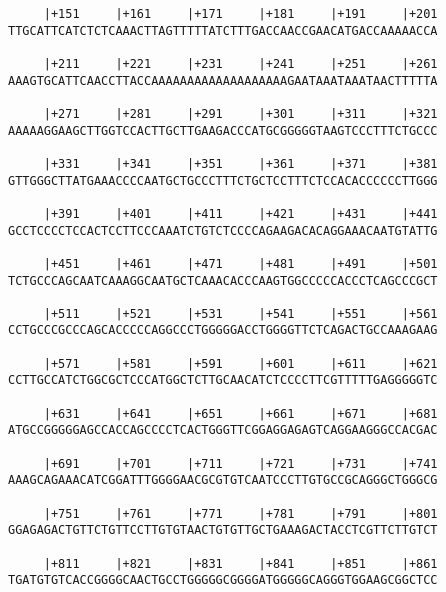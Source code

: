 \documentclass{article}
\begin{document}
\begin{Verbatim}
     |+151     |+161     |+171     |+181     |+191     |+201
TTGCATTCATCTCTCAAACTTAGTTTTTATCTTTGACCAACCGAACATGACCAAAAACCA
                                                            
     |+211     |+221     |+231     |+241     |+251     |+261
AAAGTGCATTCAACCTTACCAAAAAAAAAAAAAAAAAAAGAATAAATAAATAACTTTTTA
                                                            
     |+271     |+281     |+291     |+301     |+311     |+321
AAAAAGGAAGCTTGGTCCACTTGCTTGAAGACCCATGCGGGGGTAAGTCCCTTTCTGCCC
                                                            
     |+331     |+341     |+351     |+361     |+371     |+381
GTTGGGCTTATGAAACCCCAATGCTGCCCTTTCTGCTCCTTTCTCCACACCCCCCTTGGG
                                                            
     |+391     |+401     |+411     |+421     |+431     |+441
GCCTCCCCTCCACTCCTTCCCAAATCTGTCTCCCCAGAAGACACAGGAAACAATGTATTG
                                                            
     |+451     |+461     |+471     |+481     |+491     |+501
TCTGCCCAGCAATCAAAGGCAATGCTCAAACACCCAAGTGGCCCCCACCCTCAGCCCGCT
                                                            
     |+511     |+521     |+531     |+541     |+551     |+561
CCTGCCCGCCCAGCACCCCCAGGCCCTGGGGGACCTGGGGTTCTCAGACTGCCAAAGAAG
                                                            
     |+571     |+581     |+591     |+601     |+611     |+621
CCTTGCCATCTGGCGCTCCCATGGCTCTTGCAACATCTCCCCTTCGTTTTTGAGGGGGTC
                                                            
     |+631     |+641     |+651     |+661     |+671     |+681
ATGCCGGGGGAGCCACCAGCCCCTCACTGGGTTCGGAGGAGAGTCAGGAAGGGCCACGAC
                                                            
     |+691     |+701     |+711     |+721     |+731     |+741
AAAGCAGAAACATCGGATTTGGGGAACGCGTGTCAATCCCTTGTGCCGCAGGGCTGGGCG
                                                            
     |+751     |+761     |+771     |+781     |+791     |+801
GGAGAGACTGTTCTGTTCCTTGTGTAACTGTGTTGCTGAAAGACTACCTCGTTCTTGTCT
                                                            
     |+811     |+821     |+831     |+841     |+851     |+861
TGATGTGTCACCGGGGCAACTGCCTGGGGGCGGGGATGGGGGCAGGGTGGAAGCGGCTCC
                                                            

\end{Verbatim}
\end{document}

